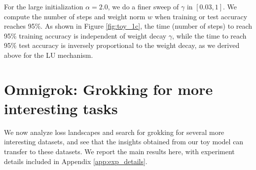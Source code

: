 \documentclass{article} %
\begin{document}
For the large initialization $\alpha=2.0$, we do a finer sweep of $\gamma$ in $[0.03,1]$. We compute the number of steps and weight norm $w$ when training or test accuracy reaches 95\%. As shown in Figure \ref{fig:toy_1c}, the time (number of steps) to reach 95\% training accuracy is independent of weight decay $\gamma$, while the time to reach 95\% test accuracy is inversely proportional to the weight decay, as we derived above for the LU mechanism. %


\section{Omnigrok: Grokking for more interesting tasks}\label{sec:grokking_exp}

We now analyze loss landscapes and search for grokking for several more interesting datasets, and see that the insights obtained from our toy model can transfer to these datasets. We report the main results here, with experiment details included in Appendix \ref{app:exp_details}. %



\end{document}
